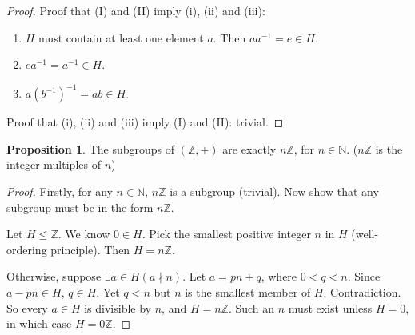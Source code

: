 \documentclass[a4paper]{article}
\theoremstyle{definition}
\newtheorem*{prop}{Proposition}
\newcommand{\N}{\mathbb{N}}
\newcommand{\Z}{\mathbb{Z}}
\begin{document}
\begin{proof}
  Proof that (I) and (II) imply (i), (ii) and (iii):
  \begin{enumerate}
  \item $H$ must contain at least one element $a$. Then $aa^{-1} = e \in H$.
  \setcounter{enumi}{2}
  \item $ea^{-1} = a^{-1} \in H$.
  \setcounter{enumi}{1}
  \item $a(b^{-1})^{-1} = ab\in H$.
  \end{enumerate}

  Proof that (i), (ii) and (iii) imply (I) and (II): trivial.
\end{proof}
\begin{prop}
  The subgroups of $(\Z, +)$  are exactly $n\Z$, for $n\in \N$. ($n\Z$ is the integer multiples of $n$)
\end{prop}
\begin{proof}
  Firstly, for any $n \in \N$, $n\Z$ is a subgroup (trivial). Now show that any subgroup must be in the form $n\Z$.

Let $H\leq \Z$. We know $0\in H$. Pick the smallest positive integer $n$ in $H$ (well-ordering principle). Then $H=n\Z$.

Otherwise, suppose $\exists a\in H(a \nmid n)$. Let $a = pn + q$, where $0 < q < n$. Since $a - pn\in H$, $q\in H$. Yet $q < n$ but $n$ is the smallest member of $H$. Contradiction. So every $a\in H$ is divisible by $n$, and $H = n\Z$. Such an $n$ must exist unless $H = {0}$, in which case $H = 0\Z$.
\end{proof}
\end{document}
